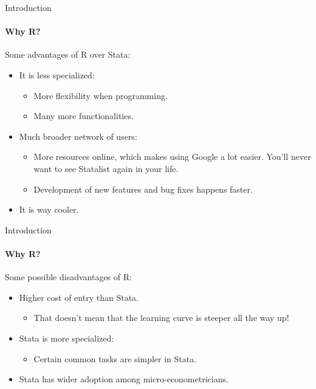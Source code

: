 \documentclass[ignorenonframetext,]{beamer}
\providecommand{\tightlist}{%
  \setlength{\itemsep}{0pt}\setlength{\parskip}{0pt}}
\begin{document}
\begin{frame}{Introduction}

\framesubtitle{Why R?}

Some advantages of R over Stata:

\begin{itemize}
\tightlist
\item
  It is less specialized:

  \begin{itemize}
  \tightlist
  \item
    More flexibility when programming.
  \item
    Many more functionalities.
  \end{itemize}
\item
  Much broader network of users:

  \begin{itemize}
  \tightlist
  \item
    More resources online, which makes using Google a lot easier. You'll
    never want to see Statalist again in your life.
  \item
    Development of new features and bug fixes happens faster.
  \end{itemize}
\item
  It is way cooler.
\end{itemize}

\end{frame}

\begin{frame}{Introduction}

\framesubtitle{Why R?}

Some possible disadvantages of R:

\begin{itemize}
\tightlist
\item
  Higher cost of entry than Stata.

  \begin{itemize}
  \tightlist
  \item
    That doesn't mean that the learning curve is steeper all the way up!
  \end{itemize}
\item
  Stata is more specialized:

  \begin{itemize}
  \tightlist
  \item
    Certain common tasks are simpler in Stata.
  \end{itemize}
\item
  Stata has wider adoption among micro-econometricians.
\end{itemize}

\end{frame}
\end{document}
